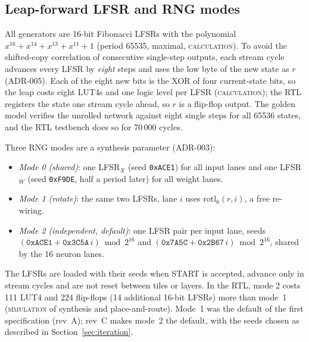 \documentclass[conference]{IEEEtran}
\newcommand{\lbl}[1]{\textsc{#1}}    %
\begin{document}
\subsection{Leap-forward LFSR and RNG modes}
All generators are 16-bit Fibonacci LFSRs with the polynomial
$x^{16}+x^{14}+x^{13}+x^{11}+1$ (period 65535, maximal, \lbl{calculation}).
To avoid the shifted-copy correlation of consecutive single-step outputs, each
stream cycle advances every LFSR by \emph{eight} steps and uses the low byte of
the new state as $r$ (ADR-005). Each of the eight new bits is the XOR of four
current-state bits, so the leap costs eight LUT4s and one logic level per LFSR
(\lbl{calculation}); the RTL registers the state one stream cycle ahead, so
$r$ is a flip-flop output.
The golden model verifies the unrolled network against eight single steps for
all 65536 states, and the RTL testbench does so for 70\,000 cycles.

Three RNG modes are a synthesis parameter (ADR-003):
\begin{itemize}
\item \emph{Mode 0 (shared)}: one LFSR$_X$ (seed \texttt{0xACE1}) for all
  input lanes and one LFSR$_W$ (seed \texttt{0xF9DE}, half a period later)
  for all weight lanes.
\item \emph{Mode 1 (rotate)}: the same two LFSRs, lane $i$ uses
  $\mathrm{rotl}_8(r,i)$, a free re-wiring.
\item \emph{Mode 2 (independent, default)}: one LFSR pair per input lane,
  seeds $(\texttt{0xACE1}+\texttt{0x3C5A}\,i)\bmod 2^{16}$ and
  $(\texttt{0x7A5C}+\texttt{0x2B67}\,i)\bmod 2^{16}$, shared by the 16 neuron
  lanes.
\end{itemize}
The LFSRs are loaded with their seeds when START is accepted, advance only in
stream cycles and are not reset between tiles or layers. In the RTL, mode 2
costs 111 LUT4 and 224 flip-flops (14 additional 16-bit LFSRs) more than mode~1
(\lbl{simulation} of synthesis and place-and-route). Mode~1 was the default of
the first specification (rev~A); rev~C makes mode~2 the default, with the
seeds chosen as described in Section~\ref{sec:iteration}.
\end{document}
